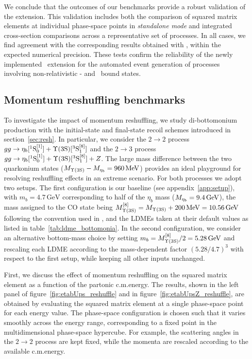 We conclude that the outcomes of our benchmarks provide a robust validation of the extension. This validation includes both the comparison of squared matrix elements at individual phase-space points in \textit{standalone mode} and integrated cross-section comparisons across a representative set of processes. In all cases, we find agreement with the corresponding results obtained with \helaconia, within the expected numerical precision. These tests confirm the reliability of the newly implemented \mgshort\ extension for the automated event generation of processes involving non-relativistic \swave- and \pwavetxt\ bound states.


\subsection{Momentum reshuffling benchmarks}\label{sec:momreshufftest}
To investigate the impact of momentum reshuffling, we study di-bottomonium production with the initial-state and final-state recoil schemes introduced in section~\ref{sec:resh}. In particular, we consider the $2\to2$ process ${gg \to \eta_b[^1 \mathrm{S}_0^{[1]}]+ \Upsilon(3\mathrm{S})[^3 \mathrm{S}_1^{[8]}]}$ and the $2\to3$ process ${gg \to \eta_b[^1 \mathrm{S}_0^{[1]}]+\Upsilon(3\mathrm{S})[^3 \mathrm{S}_1^{[8]}]+ Z}$. The large mass difference between the two quarkonium states (${M_{\Upsilon(3\mathrm{S})} - M_{\eta_b} = 960\,{\rm MeV}}$) provides an ideal playground for resolving reshuffling effects in an extreme scenario. 
For both processes we adopt two setups. The first configuration is our baseline (see appendix~\ref{app:setup}), with $m_b = 4.7\,\mathrm{GeV}$ corresponding to half of the $\eta_b$ mass ($M_{\eta_b} = 9.4\,\rm GeV$), the mass assigned to the CO state  being $M^{[8]}_{\Upsilon(3\mathrm{S})}=M_{\Upsilon(3\mathrm{S})}+200\,{\rm MeV}=10.56\,{\rm GeV}$ following the convention used in , and the LDMEs taken at their default values as listed in table~\ref{tab:ldme_bottomonia}. In the second configuration, we consider an alternative bottom-mass choice by setting $m_b = M^{[8]}_{\Upsilon(3\mathrm{S})}/2 = 5.28\,{\rm GeV}$ and rescaling each LDME according to the mass-dependent factor $\left(5.28/4.7\right)^{3}$ with respect to the first setup, while keeping all other inputs unchanged.

First, we discuss the effect of momentum reshuffling on the squared matrix element as a function of the partonic c.m.\@ energy. The results, shown in the left panel of figure~\ref{fig:etabUps_reshuffle} and in figure~\ref{fig:etabUpsZ_reshuffle}, are obtained by evaluating the squared matrix element at a single phase-space point for each energy value. The phase-space configuration is chosen such that it varies smoothly across the energy range, corresponding to a fixed point in the multidimensional phase-space hypercube. For example, the scattering angles in the $2\to2$ process are kept fixed, while the momenta are rescaled according to the available c.m.\@ energy.

